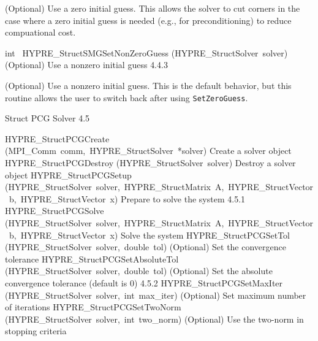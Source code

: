 \documentclass{article}
\begin{document}
\begin{cxxentry}
\begin{cxxentry}
\begin{cxxfunction}
\begin{cxxdoc}
(Optional) Use a zero initial guess.  This allows the solver to cut corners
in the case where a zero initial guess is needed (e.g., for preconditioning)
to reduce compuational cost.
\end{cxxdoc}
\end{cxxfunction}
\begin{cxxfunction}
{int\ }
        {HYPRE\_StructSMGSetNonZeroGuess}
        {(HYPRE\_StructSolver\ solver)}
        {
(Optional) Use a nonzero initial guess}
        {4.4.3}
\begin{cxxdoc}

(Optional) Use a nonzero initial guess.  This is the default behavior, but
this routine allows the user to switch back after using {\tt SetZeroGuess}.
\end{cxxdoc}
\end{cxxfunction}
\end{cxxentry}
\begin{cxxentry}
{}
        {Struct PCG Solver}
        {}
        {
}
        {4.5}
\begin{cxxnames}
        {HYPRE\_StructPCGCreate}
        {(MPI\_Comm\ comm,\ HYPRE\_StructSolver\ *solver)}
        {
Create a solver object}
        {}
\label{cxx.4.5.3}
        {HYPRE\_StructPCGDestroy}
        {(HYPRE\_StructSolver\ solver)}
        {
Destroy a solver object}
        {}
\label{cxx.4.5.4}
        {HYPRE\_StructPCGSetup}
        {(HYPRE\_StructSolver\ solver,\ HYPRE\_StructMatrix\ A,\ HYPRE\_StructVector\ b,\ HYPRE\_StructVector\ x)}
        {
Prepare to solve the system}
        {4.5.1}
        {HYPRE\_StructPCGSolve}
        {(HYPRE\_StructSolver\ solver,\ HYPRE\_StructMatrix\ A,\ HYPRE\_StructVector\ b,\ HYPRE\_StructVector\ x)}
        {
Solve the system}
        {}
\label{cxx.4.5.5}
        {HYPRE\_StructPCGSetTol}
        {(HYPRE\_StructSolver\ solver,\ double\ tol)}
        {
(Optional) Set the convergence tolerance}
        {}
\label{cxx.4.5.6}
        {HYPRE\_StructPCGSetAbsoluteTol}
        {(HYPRE\_StructSolver\ solver,\ double\ tol)}
        {
(Optional) Set the absolute convergence tolerance (default is
0)}
        {4.5.2}
        {HYPRE\_StructPCGSetMaxIter}
        {(HYPRE\_StructSolver\ solver,\ int\ max\_iter)}
        {
(Optional) Set maximum number of iterations}
        {}
\label{cxx.4.5.7}
        {HYPRE\_StructPCGSetTwoNorm}
        {(HYPRE\_StructSolver\ solver,\ int\ two\_norm)}
        {
(Optional) Use the two-norm in stopping criteria}

\end{cxxnames}
\end{cxxentry}
\end{cxxentry}
\end{document}
